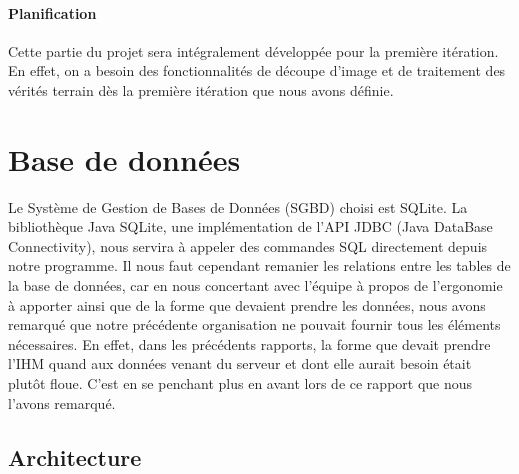 \paragraph{Planification}
Cette partie du projet sera intégralement développée pour la première itération. En effet, on a besoin des fonctionnalités de découpe d'image et de traitement des vérités terrain dès la première itération que nous avons définie.

\section{Base de données}

Le Système de Gestion de Bases de Données (SGBD) choisi est SQLite. La bibliothèque Java SQLite, une implémentation de l'API JDBC (Java DataBase Connectivity), nous servira à appeler des commandes SQL directement depuis notre programme.
Il nous faut cependant remanier les relations entre les tables de la base de données, car en nous concertant avec l'équipe à propos de l'ergonomie à apporter ainsi que de la forme que devaient prendre les données, nous avons remarqué que notre précédente organisation ne pouvait fournir tous les éléments nécessaires. En effet, dans les précédents rapports, la forme que devait prendre l'IHM quand aux données venant du serveur et dont elle aurait besoin était plutôt floue. C'est en se penchant plus en avant lors de ce rapport que nous l'avons remarqué.

\subsection{Architecture}

